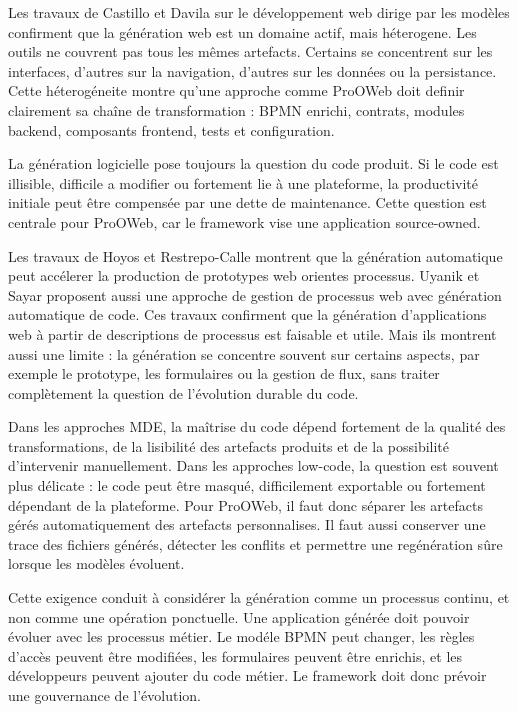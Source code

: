 Les travaux de Castillo et Davila \cite{castillo2024} sur le développement web dirige par les modèles confirment que la génération web est un domaine actif, mais héterogene. Les outils ne couvrent pas tous les mêmes artefacts. Certains se concentrent sur les interfaces, d'autres sur la navigation, d'autres sur les données ou la persistance. Cette héterogéneite montre qu'une approche comme ProOWeb doit definir clairement sa chaîne de transformation : BPMN enrichi, contrats, modules backend, composants frontend, tests et configuration.


La génération logicielle pose toujours la question du code produit. Si le code est illisible, difficile a modifier ou fortement lie à une plateforme, la productivité initiale peut être compensée par une dette de maintenance. Cette question est centrale pour ProOWeb, car le framework vise une application source-owned.

Les travaux de Hoyos et Restrepo-Calle \cite{hoyos2017} montrent que la génération automatique peut accélerer la production de prototypes web orientes processus. Uyanik et Sayar \cite{uyanik2023} proposent aussi une approche de gestion de processus web avec génération automatique de code. Ces travaux confirment que la génération d'applications web à partir de descriptions de processus est faisable et utile. Mais ils montrent aussi une limite : la génération se concentre souvent sur certains aspects, par exemple le prototype, les formulaires ou la gestion de flux, sans traiter complètement la question de l'évolution durable du code.

Dans les approches MDE, la maîtrise du code dépend fortement de la qualité des transformations, de la lisibilité des artefacts produits et de la possibilité d'intervenir manuellement. Dans les approches low-code, la question est souvent plus délicate : le code peut être masqué, difficilement exportable ou fortement dépendant de la plateforme. Pour ProOWeb, il faut donc séparer les artefacts gérés automatiquement des artefacts personnalises. Il faut aussi conserver une trace des fichiers générés, détecter les conflits et permettre une regénération sûre lorsque les modèles évoluent.

Cette exigence conduit à considérer la génération comme un processus continu, et non comme une opération ponctuelle. Une application générée doit pouvoir évoluer avec les processus métier. Le modéle BPMN peut changer, les règles d'accès peuvent être modifiées, les formulaires peuvent être enrichis, et les développeurs peuvent ajouter du code métier. Le framework doit donc prévoir une gouvernance de l'évolution.

